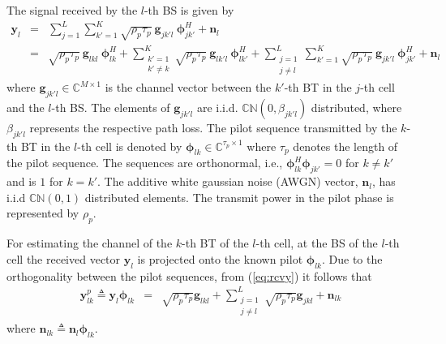 \documentclass[10pt, a4paper, twoside,fleqn]{article}
\begin{document}
The signal received by the $l$-th BS is given by
\begin{eqnarray}\label{eq:rcvy}
	\pmb{y}_{l} &=& \sum_{j=1}^{L} \sum_{k'=1}^{K}\sqrt{\rho_p \tau_p} \ \pmb{g}_{jk'l} \ \pmb{\phi}^H_{jk'}
        		    +  \pmb{n}_{l} \nonumber \\                    
    			   &=& \sqrt{\rho_p \tau_p} \ \pmb{g}_{lkl} \ \pmb{\phi}^H_{lk}
        			+  \sum_{\substack{k'=1 \\ k' \neq k}}^{K} \sqrt{\rho_p \tau_p} \ \pmb{g}_{lk'l} \ \pmb{\phi}^H_{lk'}
        		    +  \sum_{\substack{j=1 \\ j \neq l}}^{L} \sum_{k'=1}^{K} \sqrt{\rho_p \tau_p} \
                       \pmb{g}_{jk'l} \ \pmb{\phi}^H_{jk'}
    			    +  \pmb{n}_{l}
\end{eqnarray}
where $\pmb{g}_{jk'l} \in {\mathbb C}^{M \times 1}$ is the channel vector between the $k'$-th BT in the $j$-th cell and the $l$-th BS. The elements of $\pmb{g}_{jk'l}$ are i.i.d. ${\mathbb C}{\mathbb N}(0, \beta_{jk'l})$ distributed, where $\beta_{jk'l}$ represents the respective path loss. The pilot sequence transmitted by the $k$-th BT in the $l$-th cell is denoted by $\pmb{\phi}_{lk} \in {\mathbb C}^{\tau_p \times 1}$ where $\tau_p$ denotes the length of the pilot sequence. The sequences are orthonormal, i.e., $\pmb{\phi}_{lk}^H \pmb{\phi}_{jk'} = 0$ for  $k \ne k'$ and is $1$ for $k=k'$. The additive white gaussian noise (AWGN) vector, $\pmb{n}_l$, has i.i.d ${\mathbb C}{\mathbb N}(0,1)$ distributed elements. The transmit power in the pilot phase is represented by $\rho_p$.

For estimating the channel of the $k$-th BT of the $l$-th cell, at the BS of the $l$-th cell the received vector $\pmb{y}_{l}$ is projected onto the known pilot $\pmb{\phi}_{lk}$. Due to the orthogonality between the pilot sequences, from (\ref{eq:rcvy}) it follows that
\begin{eqnarray}\label{eqn:ylkp}
	\pmb{y}_{lk}^{p} \triangleq \pmb{y}_{l} \pmb{\phi}_{lk}
                          &=&     \sqrt{\rho_p\tau_p}\pmb{g}_{lkl}
                           +      \sum_{\substack{j=1 \\ j \neq l}}^{L} \sqrt{\rho_p\tau_p}\pmb{g}_{jkl}
             			   +      \pmb{n}_{lk}
\end{eqnarray}
where $\pmb{n}_{lk} \triangleq \pmb{n}_{l}\pmb{\phi}_{lk}$.
\end{document}
